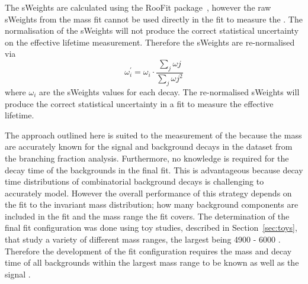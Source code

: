 The sWeights are calculated using the RooFit package~\cite{Verkerke:2003ir}, however the raw sWeights from the mass fit cannot be used directly in the \ml fit to measure the \el. The normalisation of the sWeights will not produce the correct statistical uncertainty on the effective lifetime measurement. Therefore the sWeights are re-normalised via
\begin{equation}
\omega^{'}_{i}= \omega_{i} \cdot \frac{\displaystyle\sum_{j} \omega{j}}{\displaystyle\sum_{j} \omega{j}^{2}}
\label{eq:sWeightsrex}
\end{equation}
where $\omega_{i}$ are the sWeights values for each decay. The re-normalised sWeights will produce the correct statistical uncertainty in a \ml fit to measure the \bsmumu effective lifetime.

The approach outlined here is suited to the measurement of the \bsmumu \el because the mass \pdfs are accurately known for the signal and background decays in the dataset from the branching fraction analysis. Furthermore, no knowledge is required for the decay time \pdfs of the backgrounds in the final fit. This is advantageous because decay time distributions of combinatorial background decays is challenging to accurately model. 
However the overall performance of this strategy depends on the \ml fit to the invariant mass distribution; how many background components are included in the fit and the mass range the fit covers. The determination of the final fit configuration was done using toy studies, described in Section~\ref{sec:toys}, that study a variety of different mass ranges, the largest being 4900 - 6000 \mevcc. Therefore the development of the fit configuration requires the mass and decay time \pdfs of all backgrounds within the largest mass range to be known as well as the signal \pdfs. 




